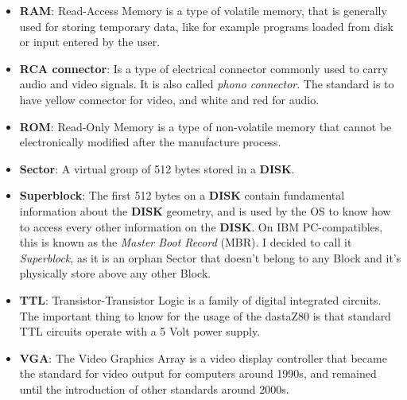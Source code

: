 \begin{itemize}
    \item \textbf{RAM}: Read-Access Memory is a type of volatile memory, that is
        generally used for storing temporary data, like for example programs
        loaded from disk or input entered by the user.
    \item \textbf{RCA connector}: Is a type of electrical connector commonly
        used to carry audio and video signals. It is also called
        \textit{phono connector}. The standard is to have yellow connector for
        video, and white and red for audio.
    \item \textbf{ROM}: Read-Only Memory is a type of non-volatile memory that 
        cannot be electronically modified after the manufacture process.
    \item \textbf{Sector}: A virtual group of 512 bytes stored in a
        \textbf{DISK}. 
    \item \textbf{Superblock}: The first 512 bytes on a \textbf{DISK} contain
        fundamental information about the \textbf{DISK} geometry, and is used by
        the OS to know how to access every other information on the
        \textbf{DISK}. On IBM PC-compatibles, this is known as the
        \textit{Master Boot Record} (MBR). I decided to call it
        \textit{Superblock}, as it is an orphan Sector that doesn't belong to
        any Block and it's physically store above any other Block.
    \item \textbf{TTL}: Transistor-Transistor Logic is a family of digital
        integrated circuits. The important thing to know for the usage of the
        dastaZ80 is that standard TTL circuits operate with a 5 Volt power
        supply.
    \item \textbf{VGA}: The Video Graphics Array is a video display controller
        that became the standard for video output for computers around 1990s,
        and remained until the introduction of other standards around 2000s.
\end{itemize}